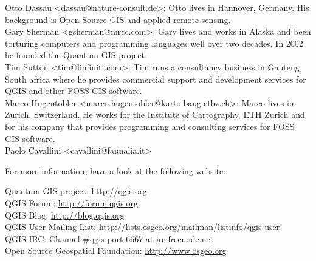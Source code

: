 Otto Dassau <dassau@nature-consult.de>: Otto lives in Hannover, Germany. His
background is Open Source GIS and applied remote sensing. 
\\Gary Sherman <gsherman@mrcc.com>: Gary lives and works in Alaska and been torturing computers and programming languages well over two decades. In 2002 he founded the Quantum GIS project. 
\\Tim Sutton <tim@linfiniti.com>: Tim runs a consultancy business in Gauteng,
South africa where he provides commercial support and development services for
QGIS and other FOSS GIS software.
\\Marco Hugentobler <marco.hugentobler@karto.baug.ethz.ch>: Marco lives in Zurich, Switzerland. He works for the Institute of Cartography, ETH Zurich and for his company that provides programming and consulting services for FOSS GIS software.
\\Paolo Cavallini <cavallini@faunalia.it>


For more information, have a look at the following website:

Quantum GIS project: \url{http://qgis.org}
\\QGIS Forum: \url{http://forum.qgis.org}
\\QGIS Blog: \url{http://blog.qgis.org}
\\QGIS User Mailing List:
\url{http://lists.osgeo.org/mailman/listinfo/qgis-user}
\\QGIS IRC: Channel \#qgis port 6667 at \url{irc.freenode.net}
\\Open Source Geospatial Foundation: \url{http://www.osgeo.org}



